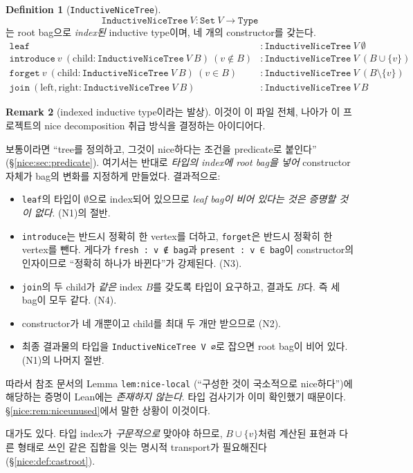 \documentclass[11pt]{article}
\theoremstyle{definition}
\newtheorem{definition}{Definition}[section]
\newtheorem{remark}[definition]{Remark}
\theoremstyle{plain}
\newcommand{\lean}[1]{\texttt{#1}}
\begin{document}
\begin{definition}[\lean{InductiveNiceTree}]
\label{nice:def:inductivenicetree}
\[
  \lean{InductiveNiceTree}\ V : \lean{Set}\ V \to \lean{Type}
\]
는 root bag으로 \emph{index된} inductive type이며, 네 개의 constructor를 갖는다.
\[
\begin{array}{ll}
  \lean{leaf} & : \lean{InductiveNiceTree}\ V\ \emptyset \\[2pt]
  \lean{introduce}\ v\ (\text{child} : \lean{InductiveNiceTree}\ V\ B)\ (v \notin B)
    & : \lean{InductiveNiceTree}\ V\ (B \cup \{v\}) \\[2pt]
  \lean{forget}\ v\ (\text{child} : \lean{InductiveNiceTree}\ V\ B)\ (v \in B)
    & : \lean{InductiveNiceTree}\ V\ (B \setminus \{v\}) \\[2pt]
  \lean{join}\ (\text{left}, \text{right} : \lean{InductiveNiceTree}\ V\ B)
    & : \lean{InductiveNiceTree}\ V\ B
\end{array}
\]
\end{definition}

\begin{remark}[indexed inductive type이라는 발상]
\label{nice:rem:indexedidea}
이것이 이 파일 전체, 나아가 이 프로젝트의 nice decomposition 취급 방식을
결정하는 아이디어다.

보통이라면 ``tree를 정의하고, 그것이 nice하다는 조건을 predicate로 붙인다''
(\S\ref{nice:sec:predicate}). 여기서는 반대로 \emph{타입의 index에 root bag을
넣어} constructor 자체가 bag의 변화를 지정하게 만들었다. 결과적으로:
\begin{itemize}
  \item \lean{leaf}의 타입이 $\emptyset$으로 index되어 있으므로
    \emph{leaf bag이 비어 있다는 것은 증명할 것이 없다}. (N1)의 절반.
  \item \lean{introduce}는 반드시 정확히 한 vertex를 더하고, \lean{forget}은
    반드시 정확히 한 vertex를 뺀다. 게다가 \lean{fresh : v ∉ bag}과
    \lean{present : v ∈ bag}이 constructor의 인자이므로 ``정확히 하나가
    바뀐다''가 강제된다. (N3).
  \item \lean{join}의 두 child가 \emph{같은} index $B$를 갖도록 타입이 요구하고,
    결과도 $B$다. 즉 세 bag이 모두 같다. (N4).
  \item constructor가 네 개뿐이고 child를 최대 두 개만 받으므로 (N2).
  \item 최종 결과물의 타입을 \lean{InductiveNiceTree V ∅}로 잡으면 root bag이
    비어 있다. (N1)의 나머지 절반.
\end{itemize}
따라서 참조 문서의 Lemma \lean{lem:nice-local} (``구성한 것이 국소적으로
nice하다'')에 해당하는 증명이 Lean에는 \emph{존재하지 않는다}. 타입 검사기가
이미 확인했기 때문이다. \S\ref{nice:rem:niceunused}에서 말한 상황이 이것이다.

대가도 있다. 타입 index가 \emph{구문적으로} 맞아야 하므로,
$B \cup \{v\}$처럼 계산된 표현과 다른 형태로 쓰인 같은 집합을 잇는 명시적
transport가 필요해진다 (\S\ref{nice:def:castroot}).
\end{remark}
\end{document}
